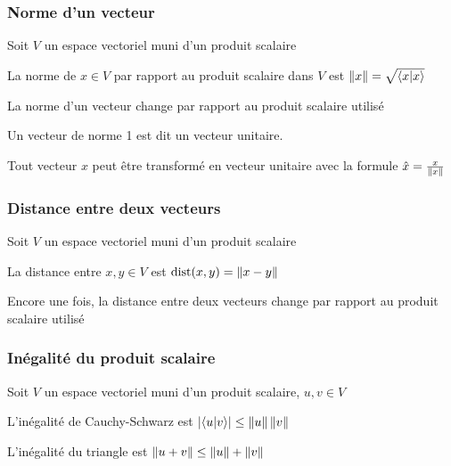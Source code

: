 \subsubsection{Norme d'un vecteur}
Soit $V$ un espace vectoriel muni d'un produit scalaire
\begin{definition}
      La norme de $x \in V$ par rapport au produit scalaire dans $V$ est $\left\lVert x\right\rVert = \sqrt{\langle x \lvert x \rangle}$
\end{definition}
\begin{remark}
      La norme d'un vecteur change par rapport au produit scalaire utilisé
\end{remark}
\begin{definition}
      Un vecteur de norme 1 est dit un vecteur unitaire.
\end{definition}
\begin{lemma}
      Tout vecteur $x$ peut être transformé en vecteur unitaire avec la formule $\hat{x} = \frac{x}{\left\lVert x\right\rVert}$
\end{lemma}

\subsubsection{Distance entre deux vecteurs}
Soit $V$ un espace vectoriel muni d'un produit scalaire
\begin{definition}
      La distance entre $x, y \in V$ est $\text{dist}(x, y) = \left\lVert x - y\right\rVert$
\end{definition}
\begin{remark}
      Encore une fois, la distance entre deux vecteurs change par rapport au produit scalaire utilisé
\end{remark}

\subsubsection{Inégalité du produit scalaire}
Soit $V$ un espace vectoriel muni d'un produit scalaire, $u, v \in V$
\begin{theorem}
      L'inégalité de Cauchy-Schwarz est $\left|\langle u \lvert v \rangle\right| \leq \left\lVert u\right\rVert\left\lVert v\right\rVert$
\end{theorem}
\begin{theorem}
      L'inégalité du triangle est $\left\lVert u + v\right\rVert \leq \left\lVert u\right\rVert + \left\lVert v\right\rVert$
\end{theorem}


